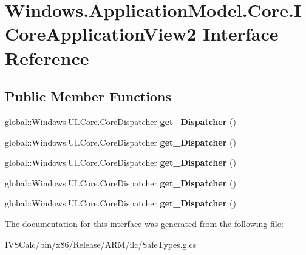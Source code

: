 \hypertarget{interface_windows_1_1_application_model_1_1_core_1_1_i_core_application_view2}{}\section{Windows.\+Application\+Model.\+Core.\+I\+Core\+Application\+View2 Interface Reference}
\label{interface_windows_1_1_application_model_1_1_core_1_1_i_core_application_view2}
\subsection*{Public Member Functions}
\begin{DoxyCompactItemize}
\item 
\mbox{\label{interface_windows_1_1_application_model_1_1_core_1_1_i_core_application_view2_aa5980bd0c4dac7abb3451973262ea291}} 
global\+::\+Windows.\+U\+I.\+Core.\+Core\+Dispatcher {\bfseries get\+\_\+\+Dispatcher} ()
\item 
\mbox{\label{interface_windows_1_1_application_model_1_1_core_1_1_i_core_application_view2_aa5980bd0c4dac7abb3451973262ea291}} 
global\+::\+Windows.\+U\+I.\+Core.\+Core\+Dispatcher {\bfseries get\+\_\+\+Dispatcher} ()
\item 
\mbox{\label{interface_windows_1_1_application_model_1_1_core_1_1_i_core_application_view2_aa5980bd0c4dac7abb3451973262ea291}} 
global\+::\+Windows.\+U\+I.\+Core.\+Core\+Dispatcher {\bfseries get\+\_\+\+Dispatcher} ()
\item 
\mbox{\label{interface_windows_1_1_application_model_1_1_core_1_1_i_core_application_view2_aa5980bd0c4dac7abb3451973262ea291}} 
global\+::\+Windows.\+U\+I.\+Core.\+Core\+Dispatcher {\bfseries get\+\_\+\+Dispatcher} ()
\item 
\mbox{\label{interface_windows_1_1_application_model_1_1_core_1_1_i_core_application_view2_aa5980bd0c4dac7abb3451973262ea291}} 
global\+::\+Windows.\+U\+I.\+Core.\+Core\+Dispatcher {\bfseries get\+\_\+\+Dispatcher} ()
\end{DoxyCompactItemize}


The documentation for this interface was generated from the following file\+:\begin{DoxyCompactItemize}
\item 
I\+V\+S\+Calc/bin/x86/\+Release/\+A\+R\+M/ilc/Safe\+Types.\+g.\+cs\end{DoxyCompactItemize}
